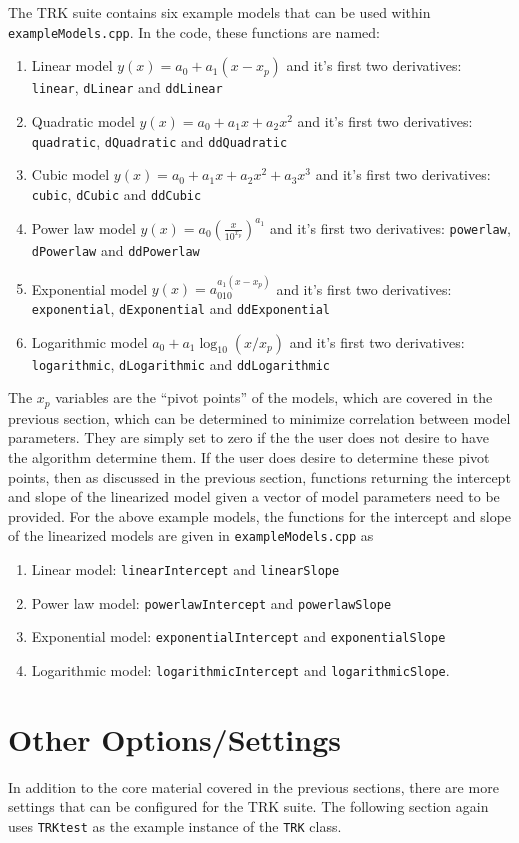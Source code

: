 \documentclass[12pt]{article}
\newcommand{\li}{\lstinline}
\begin{document}
The TRK suite contains six example models that can be used within \li{exampleModels.cpp}. In the code, these functions are named:
\begin{enumerate}
    \item Linear model $y(x)=a_0+a_1(x-x_p)$ and it's first two derivatives: \li{linear}, \li{dLinear} and \li{ddLinear}
    \item Quadratic model $y(x)=a_0+a_1x+a_2x^2$ and it's first two derivatives: \li{quadratic}, \li{dQuadratic} and \li{ddQuadratic}
    \item Cubic model $y(x)=a_0+a_1x+a_2x^2+a_3x^3$ and it's first two derivatives: \li{cubic}, \li{dCubic} and \li{ddCubic}
    \item Power law model $y(x)=a_0\left(\frac{x}{10^{x_p}}\right)^{a_1}$ and it's first two derivatives: \li{powerlaw}, \li{dPowerlaw} and \li{ddPowerlaw}
    \item Exponential model $y(x)=a_010^{a_1(x-x_p)}$ and it's first two derivatives: \li{exponential}, \li{dExponential} and \li{ddExponential}
    \item Logarithmic model $a_0+a_1\log_{10}(x/x_p)$ and it's first two derivatives: \li{logarithmic}, \li{dLogarithmic} and \li{ddLogarithmic}
\end{enumerate}
The $x_p$ variables are the ``pivot points'' of the models, which are covered in the previous section, which can be determined to minimize correlation between model parameters. They are simply set to zero if the the user does not desire to have the algorithm determine them. If the user does desire to determine these pivot points, then as discussed in the previous section, functions returning the intercept and slope of the linearized model given a vector of model parameters need to be provided. For the above example models, the functions for the intercept and slope of the linearized models are given in \li{exampleModels.cpp} as
\begin{enumerate}
    \item Linear model: \li{linearIntercept} and \li{linearSlope}
    \item Power law model: \li{powerlawIntercept} and \li{powerlawSlope}
    \item Exponential model: \li{exponentialIntercept} and \li{exponentialSlope}
    \item Logarithmic model: \li{logarithmicIntercept} and \li{logarithmicSlope}.
\end{enumerate}
\section{Other Options/Settings}
In addition to the core material covered in the previous sections, there are more settings that can be configured for the TRK suite. The following section again uses \li{TRKtest} as the example instance of the \li{TRK} class.
\end{document}
